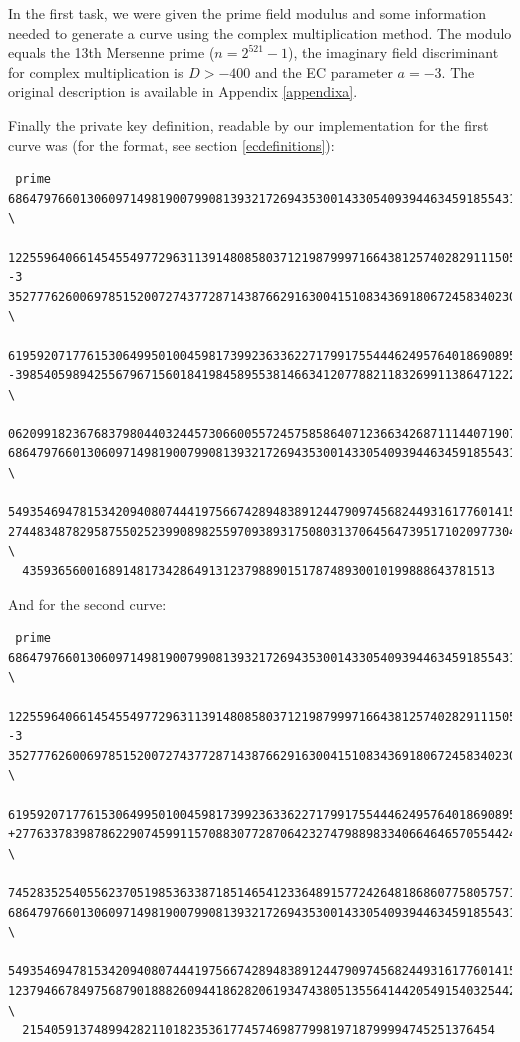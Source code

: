 \documentclass[11pt,english]{article}
\begin{document}
In the first task, we were given the prime field modulus and some information needed to generate a curve using the complex multiplication method. The modulo equals the 13th Mersenne prime ($n=2^{521}-1$), the imaginary field discriminant for complex multiplication is $D>-400$ and the EC parameter $a=-3$. The original description is available in Appendix \ref{appendixa}.

Finally the private key definition, readable by our implementation for the first curve was (for the format, see section \ref{ecdefinitions}):

\begin{verbatim}
 prime
6864797660130609714981900799081393217269435300143305409394463459185543183397656052 \
  122559640661454554977296311391480858037121987999716643812574028291115057151
-3
3527776260069785152007274377287143876629163004151083436918067245834023095352803352 \
  619592071776153064995010045981739923633622717991755444624957640186908953364
-398540598942556796715601841984589553814663412077882118326991138647122232976515044 \
  0620991823676837980440324457306600557245758586407123663426871114407190797434
6864797660130609714981900799081393217269435300143305409394463459185543183397650992 \
  549354694781534209408074441975667428948389124479097456824493161776014158579
2744834878295875502523990898255970938931750803137064564739517102097730423490652151 \
  435936560016891481734286491312379889015178748930010199888643781513
\end{verbatim}

And for the second curve:

\begin{verbatim}
 prime
6864797660130609714981900799081393217269435300143305409394463459185543183397656052 \
  122559640661454554977296311391480858037121987999716643812574028291115057151
-3
3527776260069785152007274377287143876629163004151083436918067245834023095352803352 \
  619592071776153064995010045981739923633622717991755444624957640186908953364
+277633783987862290745991157088307728706423274798898334066464657055442467551243242 \
  7452835254055623705198536338718514654123364891577242648186860775805757142087
6864797660130609714981900799081393217269435300143305409394463459185543183397650992 \
  549354694781534209408074441975667428948389124479097456824493161776014158579
1237946678497568790188826094418628206193474380513556414420549154032544215130643918 \
  215405913748994282110182353617745746987799819718799994745251376454
\end{verbatim}
\end{document}
